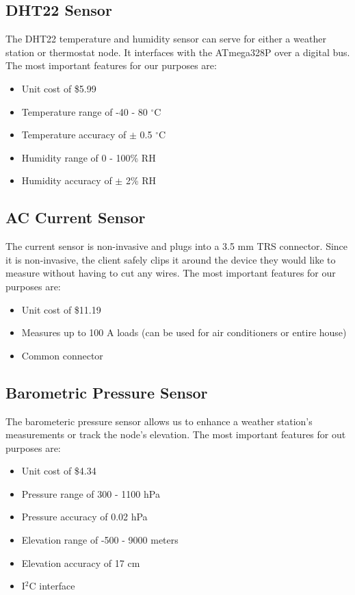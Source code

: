 		\subsection{DHT22 Sensor}
			The DHT22 temperature and humidity sensor can serve for either a weather station or thermostat node. It interfaces with the ATmega328P over a digital bus. The most important features for our purposes are:
			\begin{itemize}
				\item Unit cost of \$5.99
				\item Temperature range of -40 - 80 $^\circ$C
				\item Temperature accuracy of $\pm$ 0.5 $^\circ$C
				\item Humidity range of 0 - 100\% RH
				\item Humidity accuracy of $\pm$ 2\% RH
			\end{itemize}
		
		\subsection{AC Current Sensor}
			The current sensor is non-invasive and plugs into a 3.5 mm TRS connector. Since it is non-invasive, the client safely clips it around the device they would like to measure without having to cut any wires. The most important features for our purposes are:
			\begin{itemize}
				\item Unit cost of \$11.19
				\item Measures up to 100 A loads (can be used for air conditioners or entire house)
				\item Common connector
			\end{itemize}
		
		\subsection{Barometric Pressure Sensor}
			The barometeric pressure sensor allows us to enhance a weather station's measurements or track the node's elevation. The most important features for out purposes are:
			\begin{itemize}
				\item Unit cost of \$4.34
				\item Pressure range of 300 - 1100 hPa
				\item Pressure accuracy of 0.02 hPa
				\item Elevation range of -500 - 9000 meters
				\item Elevation accuracy of 17 cm
				\item I$^2$C interface
			\end{itemize}
		
